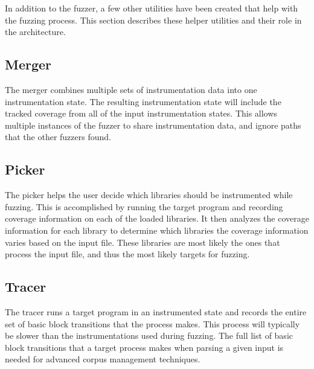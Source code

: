 In addition to the fuzzer, a few other utilities have been created that help
with the fuzzing process.  This section describes these helper utilities and
their role in the \killerbeez{} architecture.

\subsection{Merger}
The merger combines multiple sets of instrumentation data into one
instrumentation state.  The resulting instrumentation state will include the
tracked coverage from all of the input instrumentation states. This allows
multiple instances of the fuzzer to share instrumentation data, and ignore paths
that the other fuzzers found.

\subsection{Picker}
The picker helps the user decide which libraries should be instrumented while
fuzzing.  This is accomplished by running the target program and recording
coverage information on each of the loaded libraries. It then analyzes the
coverage information for each library to determine which libraries the
coverage information varies based on the input file.  These libraries are most
likely the ones that process the input file, and thus the most likely targets
for fuzzing.

\subsection{Tracer}
The tracer runs a target program in an instrumented state and records the entire
set of basic block transitions that the process makes.  This process will
typically be slower than the instrumentations used during fuzzing.  The full
list of basic block transitions that a target process makes when parsing a given
input is needed for advanced corpus management techniques.
